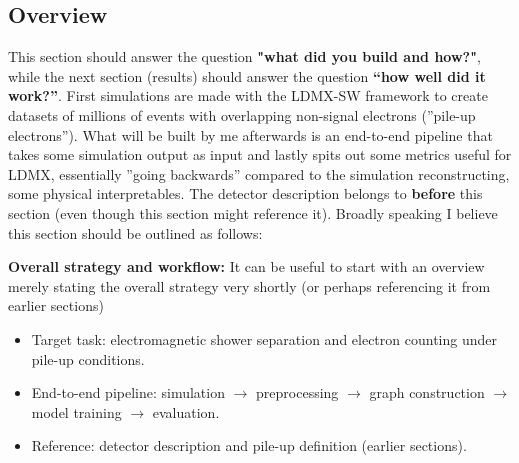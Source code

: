 \subsection{Overview}

This section should answer the question \textbf{"what did you build and how?"}, while the next section (results) should answer the question \textbf{“how well did it work?”}. First simulations are made with the LDMX-SW framework to create datasets of millions of events with overlapping non-signal electrons (''pile-up electrons''). What will be built by me afterwards is an end-to-end pipeline that takes some simulation output as input and lastly spits out some metrics useful for LDMX, essentially ''going backwards'' compared to the simulation reconstructing, some physical interpretables. The detector description belongs to \textbf{before} this section (even though this section might reference it). Broadly speaking I believe this section should be outlined as follows: 

\textbf{Overall strategy and workflow:} It can be useful to start with an overview merely stating the overall strategy very shortly (or perhaps referencing it from earlier sections)
\begin{itemize}
    \item Target task: electromagnetic shower separation and electron counting under pile-up conditions.
    \item End-to-end pipeline: simulation $\rightarrow$ preprocessing $\rightarrow$ graph construction $\rightarrow$ model training $\rightarrow$ evaluation.
    \item Reference: detector description and pile-up definition (earlier sections).
\end{itemize}

